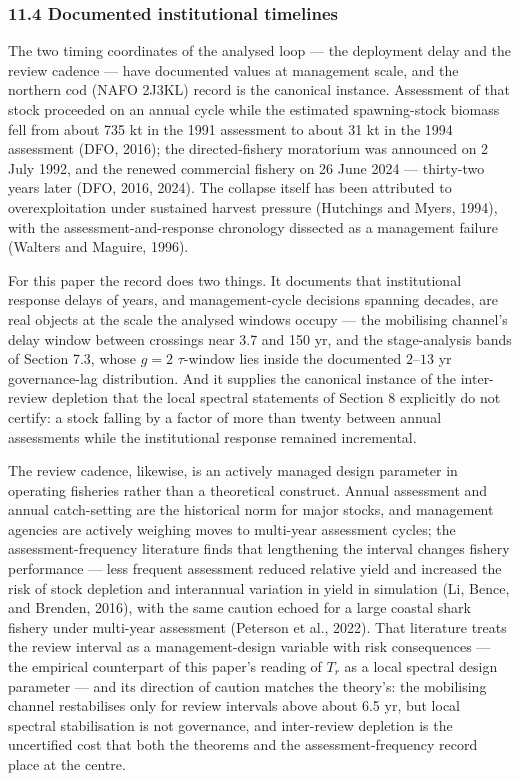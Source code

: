\documentclass[11pt]{article}
\begin{document}
\subsubsection{11.4 Documented institutional
timelines}\label{documented-institutional-timelines}

The two timing coordinates of the analysed loop --- the deployment delay
and the review cadence --- have documented values at management scale,
and the northern cod (NAFO 2J3KL) record is the canonical instance.
Assessment of that stock proceeded on an annual cycle while the
estimated spawning-stock biomass fell from about 735 kt in the 1991
assessment to about 31 kt in the 1994 assessment (DFO, 2016); the
directed-fishery moratorium was announced on 2 July 1992, and the
renewed commercial fishery on 26 June 2024 --- thirty-two years later
(DFO, 2016, 2024). The collapse itself has been attributed to
overexploitation under sustained harvest pressure (Hutchings and Myers,
1994), with the assessment-and-response chronology dissected as a
management failure (Walters and Maguire, 1996).

For this paper the record does two things. It documents that
institutional response delays of years, and management-cycle decisions
spanning decades, are real objects at the scale the analysed windows
occupy --- the mobilising channel's delay window between crossings near
3.7 and 150 yr, and the stage-analysis bands of Section 7.3, whose
\(g=2\) \(\tau\)-window lies inside the documented \(2\)--\(13\) yr
governance-lag distribution. And it supplies the canonical instance of
the inter-review depletion that the local spectral statements of Section
8 explicitly do not certify: a stock falling by a factor of more than
twenty between annual assessments while the institutional response
remained incremental.

The review cadence, likewise, is an actively managed design parameter in
operating fisheries rather than a theoretical construct. Annual
assessment and annual catch-setting are the historical norm for major
stocks, and management agencies are actively weighing moves to
multi-year assessment cycles; the assessment-frequency literature finds
that lengthening the interval changes fishery performance --- less
frequent assessment reduced relative yield and increased the risk of
stock depletion and interannual variation in yield in simulation (Li,
Bence, and Brenden, 2016), with the same caution echoed for a large
coastal shark fishery under multi-year assessment (Peterson et al.,
2022). That literature treats the review interval as a management-design
variable with risk consequences --- the empirical counterpart of this
paper's reading of \(T_r\) as a local spectral design parameter --- and
its direction of caution matches the theory's: the mobilising channel
restabilises only for review intervals above about 6.5 yr, but local
spectral stabilisation is not governance, and inter-review depletion is
the uncertified cost that both the theorems and the assessment-frequency
record place at the centre.
\end{document}
